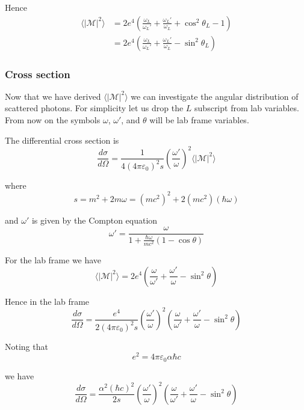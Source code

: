 Hence
\begin{align*}
\langle|\mathcal{M}|^2\rangle
&=2e^4\left(
\frac{\omega_L}{\omega_L'}+\frac{\omega_L'}{\omega_L}+\cos^2\theta_L-1
\right)
\\
&=2e^4\left(
\frac{\omega_L}{\omega_L'}+\frac{\omega_L'}{\omega_L}-\sin^2\theta_L
\right)
\end{align*}

\subsubsection*{Cross section}

Now that we have derived $\langle|\mathcal{M}|^2\rangle$
we can investigate the angular distribution of scattered photons.
For simplicity let us drop the $L$ subscript from lab variables.
From now on the symbols $\omega$, $\omega'$, and $\theta$ will be lab frame variables.

\bigskip
The differential cross section is
\begin{equation*}
\frac{d\sigma}{d\Omega}=\frac{1}{4(4\pi\varepsilon_0)^2s}
\left(\frac{\omega'}{\omega}\right)^2\langle|\mathcal{M}|^2\rangle
\end{equation*}

where
\begin{equation*}
s=m^2+2m\omega=(mc^2)^2+2(mc^2)(\hbar\omega)
\end{equation*}

and $\omega'$ is given by the Compton equation
\begin{equation*}
\omega'=\frac{\omega}{1+\frac{\hbar\omega}{mc^2}(1-\cos\theta)}
\end{equation*}

For the lab frame we have
\begin{equation*}
\langle|\mathcal{M}|^2\rangle
=2e^4\left(
\frac{\omega}{\omega'}+\frac{\omega'}{\omega}-\sin^2\theta
\right)
\end{equation*}

Hence in the lab frame
\begin{equation*}
\frac{d\sigma}{d\Omega}
=\frac{e^4}{2(4\pi\varepsilon_0)^2s}
\left(\frac{\omega'}{\omega}\right)^2
\left(
\frac{\omega}{\omega'}+\frac{\omega'}{\omega}-\sin^2\theta
\right)
\end{equation*}

Noting that
\begin{equation*}
e^2=4\pi\varepsilon_0\alpha\hbar c
\end{equation*}

we have
\begin{equation*}
\frac{d\sigma}{d\Omega}
=\frac{\alpha^2(\hbar c)^2}{2s}
\left(\frac{\omega'}{\omega}\right)^2
\left(
\frac{\omega}{\omega'}+\frac{\omega'}{\omega}-\sin^2\theta
\right)
\end{equation*}


